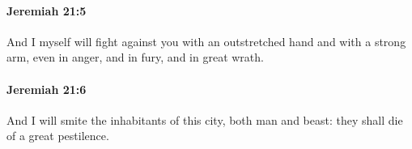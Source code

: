 		\paragraph{Jeremiah 21:5} %
			\label{JEREMIAH-21-5}

			And I myself will fight against you with an outstretched hand and with a strong arm, even in anger, and in fury, and in great wrath.


		\paragraph{Jeremiah 21:6} %
			\label{JEREMIAH-21-6}

			And I will smite the inhabitants of this city, both man and beast: they shall die of a great pestilence.


